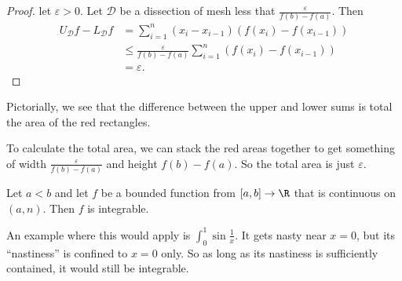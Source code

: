 \documentclass[a4paper]{article}
\begin{document}
\begin{proof}
  let $\varepsilon > 0$. Let $\mathcal{D}$ be a dissection of mesh less that $\frac{\varepsilon}{f(b) - f(a)}$. Then
  \begin{align*}
    U_\mathcal{D} f - L_\mathcal{D}f &= \sum_{i = 1}^n (x_i - x_{i - 1})(f(x_i) - f(x_{i - 1}))\\
    &\leq \frac{\varepsilon}{f(b) - f(a)} \sum_{i = 1}^n (f(x_i) - f(x_{i - 1}))\\
    &= \varepsilon.
  \end{align*}
\end{proof}

Pictorially, we see that the difference between the upper and lower sums is total the area of the red rectangles.
\begin{center}
\end{center}
To calculate the total area, we can stack the red areas together to get something of width $\frac{\varepsilon}{f(b) - f(a)}$ and height $f(b) - f(a)$. So the total area is just $\varepsilon$.

\begin{lemma}
  Let $a < b$ and let $f$ be a bounded function from $[a, b] \to \R$ that is continuous on $(a, n)$. Then $f$ is integrable.
\end{lemma}
An example where this would apply is $\int_0^1 \sin \frac{1}{x}$. It gets nasty near $x = 0$, but its ``nastiness'' is confined to $x = 0$ only. So as long as its nastiness is sufficiently contained, it would still be integrable.
\end{document}
